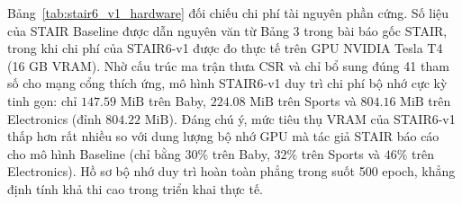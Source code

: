 \begin{table}[H]
\centering
\small
\setlength{\tabcolsep}{5.0pt}
\renewcommand{\arraystretch}{1.18}
\caption{So sánh mức tiêu thụ bộ nhớ GPU và thời gian huấn luyện giữa STAIR Baseline (số liệu công bố chính thức trong Bảng 3 của bài báo STAIR) và STAIR6-v1 (BSCV).}
\label{tab:stair6_v1_hardware}
\end{table}

Bảng~\ref{tab:stair6_v1_hardware} đối chiếu chi phí tài nguyên phần cứng. Số liệu của STAIR Baseline được dẫn nguyên văn từ Bảng 3 trong bài báo gốc STAIR, trong khi chi phí của STAIR6-v1 được đo thực tế trên GPU NVIDIA Tesla T4 (16 GB VRAM). Nhờ cấu trúc ma trận thưa CSR và chỉ bổ sung đúng 41 tham số cho mạng cổng thích ứng, mô hình STAIR6-v1 duy trì chi phí bộ nhớ cực kỳ tinh gọn: chỉ $147.59\text{ MiB}$ trên Baby, $224.08\text{ MiB}$ trên Sports và $804.16\text{ MiB}$ trên Electronics (đỉnh $804.22\text{ MiB}$). Đáng chú ý, mức tiêu thụ VRAM của STAIR6-v1 thấp hơn rất nhiều so với dung lượng bộ nhớ GPU mà tác giả STAIR báo cáo cho mô hình Baseline (chỉ bằng $30\%$ trên Baby, $32\%$ trên Sports và $46\%$ trên Electronics). Hồ sơ bộ nhớ duy trì hoàn toàn phẳng trong suốt 500 epoch, khẳng định tính khả thi cao trong triển khai thực tế.

